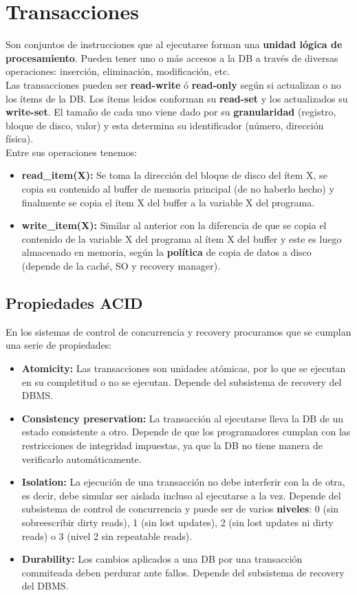 ﻿\section*{Transacciones}
Son conjuntos de instrucciones que al ejecutarse forman una \textbf{unidad lógica de procesamiento}. Pueden tener uno o más accesos a la DB a través de diversas operaciones: inserción, eliminación, modificación, etc. \\
Las transacciones pueden ser \textbf{read-write} ó \textbf{read-only} según si actualizan o no los ítems de la DB. Los ítems leidos conforman su \textbf{read-set} y los actualizados su \textbf{write-set}. El tamaño de cada uno viene dado por su \textbf{granularidad} (registro, bloque de disco, valor) y esta determina su identificador (número, dirección física). \\
Entre sus operaciones tenemos:
\begin{itemize}
    \item \textbf{read\_item(X):} Se toma la dirección del bloque de disco del ítem X, se copia su contenido al buffer de memoria principal (de no haberlo hecho) y finalmente se copia el ítem X del buffer a la variable X del programa.
    \item \textbf{write\_item(X):} Similar al anterior con la diferencia de que se copia el contenido de la variable X del programa al ítem X del buffer y este es luego almacenado en memoria, según la \textbf{política} de copia de datos a disco (depende de la caché, SO y recovery manager).
\end{itemize}

\subsection*{Propiedades ACID}
En los sistemas de control de concurrencia y recovery procuramos que se cumplan una serie de propiedades:
\begin{itemize}
    \item \textbf{Atomicity:} Las transacciones son unidades atómicas, por lo que se ejecutan en su completitud o no se ejecutan. Depende del subsistema de recovery del DBMS.
    \item \textbf{Consistency preservation:} La transacción al ejecutarse lleva la DB de un estado consistente a otro. Depende de que los programadores cumplan con las restricciones de integridad impuestas, ya que la DB no tiene manera de verificarlo automáticamente.
    \item \textbf{Isolation:} La ejecución de una transacción no debe interferir con la de otra, es decir, debe simular ser aislada incluso al ejecutarse a la vez. Depende del subsistema de control de concurrencia y puede ser de varios \textbf{niveles}: 0 (sin sobreescribir dirty reads), 1 (sin lost updates), 2 (sin lost updates ni dirty reads) o 3 (nivel 2 sin repeatable reads).
    \item \textbf{Durability:} Los cambios aplicados a una DB por una transacción commiteada deben perdurar ante fallos. Depende del subsistema de recovery del DBMS.
\end{itemize}

